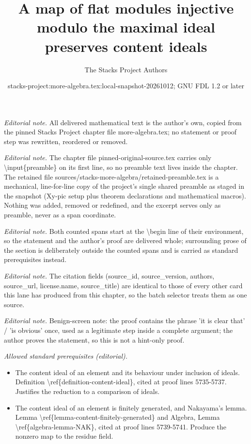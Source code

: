 \documentclass[10pt,a4paper]{amsart}
\title{A map of flat modules injective modulo the maximal ideal preserves content ideals}
\author{The Stacks Project Authors}
\date{stacks-project:more-algebra.tex:local-snapshot-20261012; GNU FDL 1.2 or later}
\theoremstyle{plain}
\theoremstyle{definition}
\theoremstyle{remark}
\numberwithin{equation}{subsection}
\begin{document}
\maketitle
\setcounter{subsection}{1}
\noindent\textit{Editorial note.} All delivered mathematical text is the author's own, copied from the pinned Stacks Project chapter file more-algebra.tex; no statement or proof step was rewritten, reordered or removed.\par\medskip
\noindent\textit{Editorial note.} The chapter file pinned-original-source.tex carries only \textbackslash{}input\{preamble\} on its first line, so no preamble text lives inside the chapter. The retained file sources/stacks-more-algebra/retained-preamble.tex is a mechanical, line-for-line copy of the project's single shared preamble as staged in the snapshot (Xy-pic setup plus theorem declarations and mathematical macros). Nothing was added, removed or redefined, and the excerpt serves only as preamble, never as a span coordinate.\par\medskip
\noindent\textit{Editorial note.} Both counted spans start at the \textbackslash{}begin line of their environment, so the statement and the author's proof are delivered whole; surrounding prose of the section is deliberately outside the counted spans and is carried as standard prerequisites instead.\par\medskip
\noindent\textit{Editorial note.} The citation fields (source\_id, source\_version, authors, source\_url, license.name, source\_title) are identical to those of every other card this lane has produced from this chapter, so the batch selector treats them as one source.\par\medskip
\noindent\textit{Editorial note.} Benign-screen note: the proof contains the phrase 'it is clear that' / 'is obvious' once, used as a legitimate step inside a complete argument; the author proves the statement, so this is not a hint-only proof.\par\medskip
\noindent\textit{Allowed standard prerequisites (editorial).}\begin{itemize}
\item The content ideal of an element and its behaviour under inclusion of ideals. Definition \textbackslash{}ref\{definition-content-ideal\}, cited at proof lines 5735-5737. Justifies the reduction to a comparison of ideals.
\item The content ideal of an element is finitely generated, and Nakayama's lemma. Lemma \textbackslash{}ref\{lemma-content-finitely-generated\} and Algebra, Lemma \textbackslash{}ref\{algebra-lemma-NAK\}, cited at proof lines 5739-5741. Produce the nonzero map to the residue field.
\end{itemize}\medskip
\end{document}
